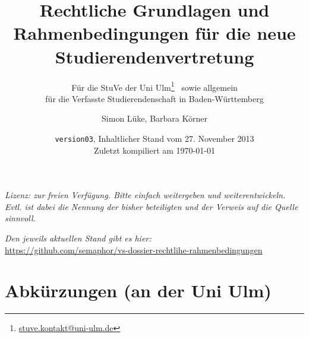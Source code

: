 \documentclass[
10pt,
a4paper,
twoside,								%
titlepage=false,							%
draft=false								%
]{scrartcl}
\begin{document}
\titlehead{\href{http://www.uni-ulm.de/stuve}{StuVe – StudierendenVertretung, uulm}}


\subject{}

\title{Rechtliche Grundlagen und Rahmenbedingungen für die neue Studierendenvertretung}

\subtitle{Für die StuVe der Uni Ulm\thanks{\href{mailto:stuve.kontakt@uni-ulm.de}{stuve.kontakt@uni-ulm.de}}~ sowie allgemein\\für die Verfasste Studierendenschaft in Baden-Württemberg}

\author{Simon Lüke, Barbara Körner}


\date{\texttt{version03}, Inhaltlicher Stand vom 27. November 2013\\Zuletzt kompiliert am \today}

\maketitle
\thispagestyle{empty}

\tableofcontents

\vfill

\begin{center}
	\textit{Lizenz: zur freien Verfügung. Bitte einfach weitergeben und weiterentwickeln. Evtl. ist dabei die Nennung der bisher beteiligten und der Verweis auf die Quelle sinnvoll.}

	\textit{Den jeweils aktuellen Stand gibt es hier:\\}
	\url{https://github.com/semaphor/vs-dossier-rechtlihe-rahmenbedingungen}
\end{center}



\newpage
\thispagestyle{empty}

\section*{Abkürzungen (an der Uni Ulm)}

\end{document}
